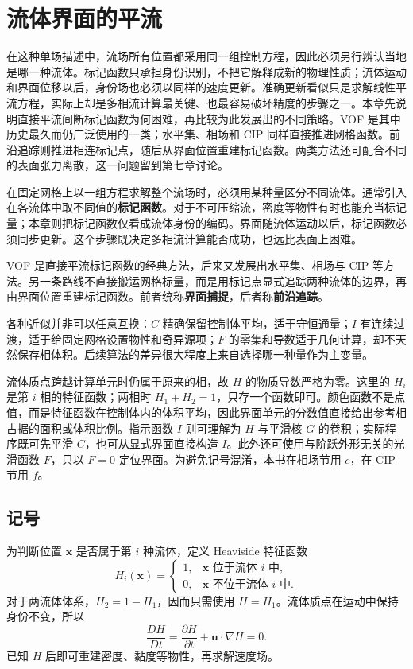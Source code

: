 \documentclass[11pt,a4paper,openany,fontset=none]{ctexbook}
\begin{document}
\chapter{流体界面的平流}

在这种单场描述中，流场所有位置都采用同一组控制方程，因此必须另行辨认当地是哪一种流体。标记函数只承担身份识别，不把它解释成新的物理性质；流体运动和界面位移以后，身份场也必须以同样的速度更新。准确更新看似只是求解线性平流方程，实际上却是多相流计算最关键、也最容易破坏精度的步骤之一。本章先说明直接平流间断标记函数为何困难，再比较为此发展出的不同策略。VOF 是其中历史最久而仍广泛使用的一类；水平集、相场和 CIP 同样直接推进网格函数。前沿追踪则推进相连标记点，随后从界面位置重建标记函数。两类方法还可配合不同的表面张力离散，这一问题留到第七章讨论。

在固定网格上以一组方程求解整个流场时，必须用某种量区分不同流体。通常引入在各流体中取不同值的\textbf{标记函数}。对于不可压缩流，密度等物性有时也能充当标记量；本章则把标记函数仅看成流体身份的编码。界面随流体运动以后，标记函数必须同步更新。这个步骤既决定多相流计算能否成功，也远比表面上困难。

VOF 是直接平流标记函数的经典方法，后来又发展出水平集、相场与 CIP 等方法。另一条路线不直接搬运网格标量，而是用标记点显式追踪两种流体的边界，再由界面位置重建标记函数。前者统称\textbf{界面捕捉}，后者称\textbf{前沿追踪}。

各种近似并非可以任意互换：$C$ 精确保留控制体平均，适于守恒通量；$I$ 有连续过渡，适于给固定网格设置物性和奇异源项；$F$ 的零集和导数适于几何计算，却不天然保存相体积。后续算法的差异很大程度上来自选择哪一种量作为主变量。

流体质点跨越计算单元时仍属于原来的相，故 $H$ 的物质导数严格为零。这里的 $H_i$ 是第 $i$ 相的特征函数；两相时 $H_1+H_2=1$，只存一个函数即可。颜色函数不是点值，而是特征函数在控制体内的体积平均，因此界面单元的分数值直接给出参考相占据的面积或体积比例。指示函数 $I$ 则可理解为 $H$ 与平滑核 $G$ 的卷积；实际程序既可先平滑 $C$，也可从显式界面直接构造 $I$。此外还可使用与阶跃外形无关的光滑函数 $F$，只以 $F=0$ 定位界面。为避免记号混淆，本书在相场节用 $c$，在 CIP 节用 $f$。

\section{记号}

为判断位置 $\bm x$ 是否属于第 $i$ 种流体，定义 Heaviside 特征函数
\begin{equation}
H_i(\bm x)=
\begin{cases}
1,&\bm x\text{ 位于流体 }i\text{ 中},\\
0,&\bm x\text{ 不位于流体 }i\text{ 中}.
\end{cases}
\tag{4.1}
\end{equation}
对于两流体体系，$H_2=1-H_1$，因而只需使用 $H=H_1$。流体质点在运动中保持身份不变，所以
\begin{equation}
\frac{DH}{Dt}=\frac{\partial H}{\partial t}+\bm u\cdot\nabla H=0.
\tag{4.2}
\end{equation}
已知 $H$ 后即可重建密度、黏度等物性，再求解速度场。
\end{document}
